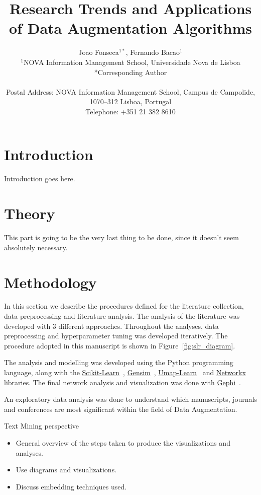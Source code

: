\documentclass[parskip=full]{scrartcl}
\date{}
\title{%
    Research Trends and Applications of Data Augmentation Algorithms
}
\author{%
	Joao Fonseca\(^{1*}\), Fernando Bacao\(^{1}\)
	\\
	\small{\(^{1}\)NOVA Information Management School, Universidade Nova de Lisboa}
	\\
	\small{*Corresponding Author}
	\\
	\\
	\small{Postal Address: NOVA Information Management School, Campus de
    Campolide, 1070--312 Lisboa, Portugal}
	\\
	\small{Telephone: +351 21 382 8610}
}
\begin{document}
\maketitle

\section{Introduction}

Introduction goes here.

\section{Theory}

This part is going to be the very last thing to be done, since it doesn't seem
absolutely necessary.

\section{Methodology}

In this section we describe the procedures defined for the literature
collection, data preprocessing and literature analysis. The analysis of the
literature was developed with 3 different approaches. Throughout the
analyses, data preprocessing and hyperparameter tuning was developed
iteratively. The procedure adopted in this manuscript is shown in
Figure~\ref{fig:slr_diagram}.

The analysis and modelling was developed using the Python programming
language, along with the
\href{https://scikit-learn.org/stable/}{Scikit-Learn}~\cite{Pedregosa2011},
\href{https://radimrehurek.com/gensim/}{Gensim}~\cite{Rehurek2010},
\href{https://github.com/lmcinnes/umap}{Umap-Learn}~\cite{Mcinnes2018} and
\href{https://networkx.org/}{Networkx}~\cite{Hagberg2008} libraries. The final
network analysis and visualization was done with
\href{https://gephi.org/}{Gephi}~\cite{Bastian2009}. 

An exploratory data analysis was done to understand which manuscripts, journals
and conferences are most significant within the field of Data Augmentation. 

Text Mining perspective

\begin{itemize}
    \item General overview of the steps taken to produce the visualizations
        and analyses.
    \item Use diagrams and visualizations.
    \item Discuss embedding techniques used.
\end{itemize}
\end{document}
